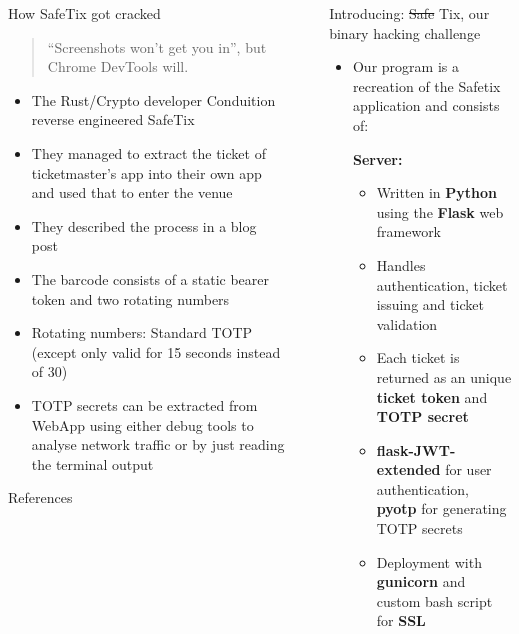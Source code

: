 \documentclass[final,dvipsnames]{beamer}
\newcommand{\soutthick}[1]{%
    \renewcommand{\ULthickness}{4pt}%
       \sout{#1}%
    \renewcommand{\ULthickness}{.4pt}%
}
\newlength{\sepwidth}
\newlength{\colwidth}
\newcommand{\separatorcolumn}{\begin{column}{\sepwidth}\end{column}}
\begin{document}
\begin{frame}[t, fragile]
\begin{columns}[t]
\begin{column}{\colwidth}
    \begin{block}{How SafeTix got cracked}
        \begin{quotation}
            “Screenshots won’t get you in”, but Chrome DevTools will.
        \end{quotation}
        \begin{itemize}
            \item The Rust/Crypto developer Conduition reverse engineered SafeTix \cite{conduition}
            \item They managed to extract the ticket of ticketmaster's app into their own app and used that to enter the venue
            \item They described the process in a blog post \cite{reverse_engineering_ticketmaster}
            \item The barcode consists of a static bearer token and two rotating numbers \cite{reverse_engineering_ticketmaster}
            \item Rotating numbers: Standard TOTP (except only valid for 15 seconds instead of 30)
            \item TOTP secrets can be extracted from WebApp using either debug tools to analyse network traffic or by just reading the terminal output
        \end{itemize}
    \end{block}

    \begin{block}{References}
		\footnotesize{}
	\end{block}

\end{column}

\separatorcolumn

\begin{column}{\colwidth}

    \begin{block}{Introducing: \soutthick{Safe}Tix, our binary hacking challenge}

		\begin{itemize}
			\item Our program is a recreation of the Safetix application and consists of:
            
            \textbf{Server:}
            \begin{itemize}
                \item Written in \textbf{Python} using the \textbf{Flask} web framework
                \item Handles authentication, ticket issuing and ticket validation
                \item Each ticket is returned as an unique \textbf{ticket token} and \textbf{TOTP secret}
                \item \textbf{flask-JWT-extended} for user authentication, \textbf{pyotp} for generating TOTP secrets
                \item Deployment with \textbf{gunicorn} and custom bash script for \textbf{SSL}
            \end{itemize}
        

\end{itemize}
\end{block}
\end{column}
\end{columns}
\end{frame}
\end{document}
